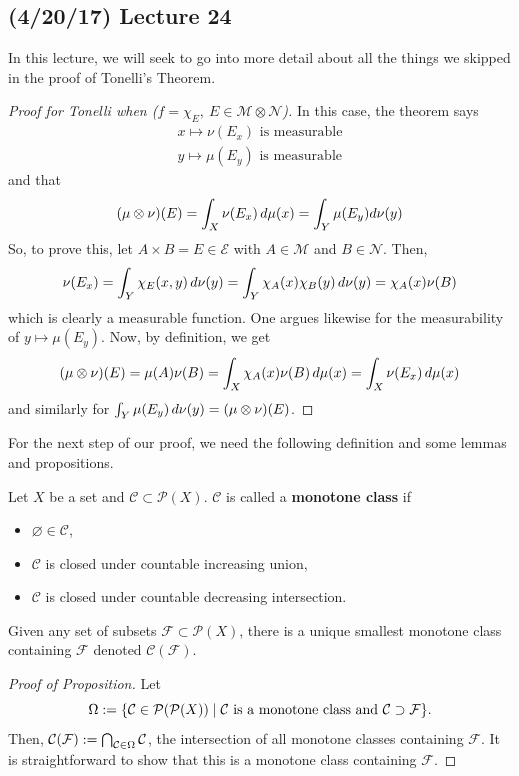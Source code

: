 \documentclass[11pt,leqno,oneside]{amsbook}
\numberwithin{thm}{section}
\renewcommand{\P}{\mathcal{P}} %
\newcommand{\M}{\mathcal{M}} %
\newcommand{\F}{\mathcal{F}}
\newcommand{\Ep}{\mathcal{E}} %
\newcommand{\cN}{\mathcal{N}}
\newcommand{\cC}{\mathcal{C}} %
\newcommand{\ox}{\otimes}
\renewcommand{\emptyset}{\varnothing}
\renewcommand{\de}{\textbf} %
\begin{document}
\subsection*{(4/20/17) Lecture 24}
In this lecture, we will seek to go into more detail about all the
things we skipped in the proof of Tonelli's Theorem.
\begin{proof}[Proof for Tonelli when (\(f = \chi_E,\ E \in \M \ox \cN\))]
  In this case, the theorem
    says
    \begin{align*}
      x \mapsto \nu(E_x) \text{ is measurable}\\
      y \mapsto \mu(E_y) \text{ is measurable}
    \end{align*}
    and that \[
      (\mu \ox \nu)(E) = \int_X \nu(E_x) \d\mu(x) = \int_Y \mu(E_y) d\nu(y)
    \]
    So, to prove this, let \(A \times B = E \in \Ep\) with \(A \in
    \M\) and \(B \in \cN\). Then, \[
      \nu(E_x) = \int_Y \chi_E(x,y) \, d\nu(y) = \int_Y \chi_A(x)\chi_B(y)
      \, d\nu(y) = \chi_A(x)\nu(B)
    \]
    which is clearly a measurable function. One argues likewise for the
    measurability of \(y \mapsto \mu(E_y)\). Now, by definition, we
    get \[
      (\mu \ox \nu)(E) = \mu(A)\nu(B) = \int_X \chi_A(x) \nu(B)
      \d\mu(x) = \int_X \nu(E_x) \d\mu(x)
    \]
    and similarly for \(\int_Y \mu(E_y) \d\nu(y) = (\mu \ox \nu)(E)\).
  \end{proof}
  For the next step of our proof, we need the following definition and
  some lemmas and propositions.
  \begin{defn}
    Let \(X\) be a set and \(\cC \subset \P(X)\). \(\cC\) is called a
    \de{monotone class} if
    \begin{itemize}
    \item \(\emptyset \in \cC\),
    \item \(\cC\) is closed under countable increasing union,
    \item \(\cC\) is closed under countable decreasing intersection.
    \end{itemize}
  \end{defn}
  \begin{prop}
    Given any set of subsets \(\F \subset \P(X)\), there is a unique
    smallest monotone class containing \(\F\) denoted \(\cC(\F)\).
  \end{prop}
  \begin{proof}[Proof of Proposition]
    Let \[
\Omega := \{\cC \in \P(\P(X)) \st \cC \text{ is a monotone
      class and }\cC \supset \F\}.
  \]
  Then, \(\cC(\F) := \Intersect_{\cC \in \Omega} \cC\), the
  intersection of all monotone classes containing \(\F\). It is
  straightforward to show that this is a monotone class containing
  \(\F\).
\end{proof}
\end{document}
